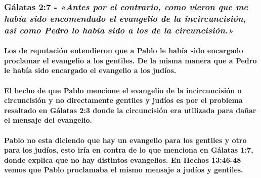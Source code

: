 \documentclass[11a pt,twoside]{article}
\newcommand{\scripture}[1]{%
  {\fontsize{12pt}{16pt}\selectfont\ScriptureFont\itshape #1}%
}
\let\oldsubsubsection\subsubsection
\renewcommand{\subsubsection}{\needspace{4\baselineskip}\oldsubsubsection}
\let\oldparagraph\paragraph
\renewcommand{\paragraph}{\needspace{3\baselineskip}\oldparagraph}
\begin{document}
\subsubsection{\texorpdfstring{Gálatas 2:7 -
\scripture{«Antes por el contrario, como vieron que me había sido encomendado el evangelio de la incircuncisión, así como Pedro lo había sido a los de la circuncisión.»}}{Gálatas 2:7 - }}\label{guxe1latas-27---antes-por-el-contrario-como-vieron-que-me-habuxeda-sido-encomendado-el-evangelio-de-la-incircuncisiuxf3n-asuxed-como-pedro-lo-habuxeda-sido-a-los-de-la-circuncisiuxf3n.}

\paragraph{Los de reputación entendieron que a Pablo le había sido
encargado proclamar el evangelio a los gentiles. De la misma manera que
a Pedro le había sido encargado el evangelio a los
judíos.}\label{los-de-reputaciuxf3n-entendieron-que-a-pablo-le-habuxeda-sido-encargado-proclamar-el-evangelio-a-los-gentiles.-de-la-misma-manera-que-a-pedro-le-habuxeda-sido-encargado-el-evangelio-a-los-juduxedos.}

\paragraph{El hecho de que Pablo mencione el evangelio de la
incircuncisión o circuncisión y no directamente gentiles y judíos es por
el problema resaltado en Gálatas 2:3 donde la circuncisión era utilizada
para dañar el mensaje del
evangelio.}\label{el-hecho-de-que-pablo-mencione-el-evangelio-de-la-incircuncisiuxf3n-o-circuncisiuxf3n-y-no-directamente-gentiles-y-juduxedos-es-por-el-problema-resaltado-en-guxe1latas-23-donde-la-circuncisiuxf3n-era-utilizada-para-dauxf1ar-el-mensaje-del-evangelio.}

\paragraph{Pablo no esta diciendo que hay un evangelio para los gentiles
y otro para los judíos, esto iría en contra de lo que menciona en
Gálatas 1:7, donde explica que no hay distintos evangelios. En Hechos
13:46-48 vemos que Pablo proclamaba el mismo mensaje a judíos y
gentiles.}\label{pablo-no-esta-diciendo-que-hay-un-evangelio-para-los-gentiles-y-otro-para-los-juduxedos-esto-iruxeda-en-contra-de-lo-que-menciona-en-guxe1latas-17-donde-explica-que-no-hay-distintos-evangelios.-en-hechos-1346-48-vemos-que-pablo-proclamaba-el-mismo-mensaje-a-juduxedos-y-gentiles.}
\end{document}
